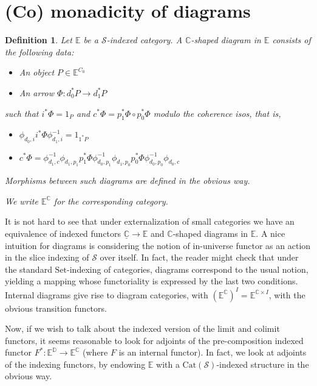 \documentclass[10pt, oneside]{article}
\newtheorem{definition}[theorem]{Definition}
\begin{document}
\section{(Co) monadicity of diagrams}
\begin{definition}
    Let $\mathbb{E}$ be a $\mathcal{S}$-indexed category. A $\mathbb{C}$-shaped diagram in $\mathbb{E}$ consists of the following data:

    \begin{itemize}
        \item An object $P \in \mathbb{E}^{C_0}$
        \item An arrow $\Phi: d_0^\ast P \to d_1^\ast P$
    \end{itemize}

    such that $i^\ast \Phi = 1_P$ and $c^\ast \Phi = p_1^\ast \Phi \circ p_0^\ast \Phi$ modulo the coherence isos, that is,

    \begin{itemize}
        \item $ \phi_{d_0, i} i^\ast \Phi \phi_{d_1, i}^{-1} = 1_{1^\ast P}$

        \item $c^\ast \Phi = \phi_{d_1, c}^{-1} \phi_{d_1, p_1} p_1^\ast \Phi \phi_{d_0, p_1}^{-1} \phi_{d_1, p_0} p_0^\ast \Phi \phi_{d_0, p_0}^{-1} \phi_{d_0, c}$
    \end{itemize}
    
    Morphisms between such diagrams are defined in the obvious way.

    We write $\mathbb{E}^\mathbb{C}$ for the corresponding category.
\end{definition}

It is not hard to see that under externalization of small categories we have an equivalence of indexed functors $\underline{\mathbb{C}} \to \mathbb{E}$ and $\mathbb{C}$-shaped diagrams in $\mathbb{E}$. A nice intuition for diagrams is considering the notion of in-universe functor as an action in the slice indexing of $\mathcal{S}$ over itself. In fact, the reader might check that under the standard $\mathrm{Set}$-indexing of categories, diagrams correspond to the usual notion, yielding a mapping whose functoriality is expressed by the last two conditions. Internal diagrams give rise to diagram categories, with $\left( \mathbb{E}^\mathbb{C} \right)^I = \mathbb{E}^{\mathbb{C} \times I}$, with the obvious transition functors.

Now, if we wish to talk about the indexed version of the limit and colimit functors, it seems reasonable to look for adjoints of the pre-composition indexed functor $F^\ast: \mathbb{E}^\mathbb{D} \to \mathbb{E}^\mathbb{C}$ (where $F$ is an internal functor). In fact, we look at adjoints of the indexing functors, by endowing $\mathbb{E}$ with a $\mathrm{Cat}(\mathcal{S})$-indexed structure in the obvious way.
\end{document}
